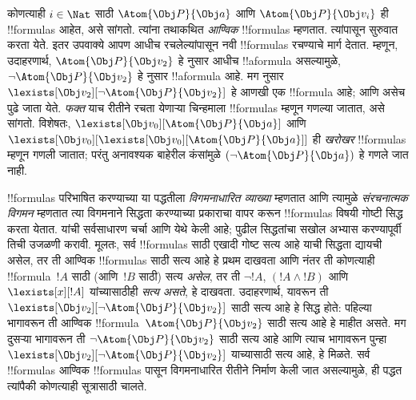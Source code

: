 \documentclass[../../../include/open-logic-section]{subfiles}
\begin{document}
कोणत्याही $i \in \Nat$ साठी $\Atom{\Obj P}{\Obj a}$ आणि
$\Atom{\Obj P}{\Obj v_i}$ ही !!{formula}s आहेत, असे
 सांगतो. त्यांना तथाकथित \emph{आण्विक} !!{formula}s
म्हणतात. त्यांपासून सुरुवात करता येते. इतर उपवाक्ये आपण आधीच
रचलेल्यांपासून नवी !!{formula}s रचण्याचे मार्ग देतात. म्हणून,
उदाहरणार्थ, $\Atom{\Obj P}{\Obj v_2}$ हे  नुसार आधीच
!!a{formula} असल्यामुळे, $\lnot \Atom{\Obj P}{\Obj v_2}$ हे
 नुसार !!a{formula} आहे. मग
 नुसार $\lexists[\Obj v_2][\lnot \Atom{\Obj P}{\Obj
v_2}]$ हे आणखी एक !!{formula} आहे; आणि असेच पुढे जाता येते. \emph{फक्त} याच
रीतीने रचता येणाऱ्या चिन्हमाला !!{formula}s म्हणून गणल्या जातात, असे
 सांगतो. विशेषतः,
$\lexists[\Obj v_0][\Atom{\Obj P}{\Obj a}]$ आणि $\lexists[\Obj
  v_0][\lexists[\Obj v_0][\Atom{\Obj P}{\Obj a}]]$ ही
\emph{खरोखर} !!{formula}s म्हणून गणली जातात; परंतु अनावश्यक बाहेरील
कंसांमुळे $(\lnot \Atom{\Obj P}{\Obj a})$ हे गणले जात नाही.

!!{formula}s परिभाषित करण्याच्या या पद्धतीला \emph{विगमनाधारित
व्याख्या} म्हणतात आणि त्यामुळे \emph{संरचनात्मक विगमन} म्हणतात त्या
विगमनाने सिद्धता करण्याच्या प्रकाराचा वापर करून !!{formula}s विषयी
गोष्टी सिद्ध करता येतात. यांची सर्वसाधारण चर्चा
 आणि  येथे केली
आहे; पुढील सिद्धतांचा सखोल अभ्यास करण्यापूर्वी तिची उजळणी करावी. मूलतः,
सर्व !!{formula}s साठी एखादी गोष्ट सत्य आहे याची सिद्धता द्यायची असेल,
तर ती आण्विक !!{formula}s साठी सत्य आहे हे प्रथम दाखवता आणि नंतर ती
कोणत्याही !!{formula}~$!A$ साठी (आणि~$!B$ साठी) सत्य \emph{असेल}, तर
ती $\lnot !A$, $(!A \land !B)$ आणि $\lexists[x][!A]$ यांच्यासाठीही
\emph{सत्य असते}, हे दाखवता. उदाहरणार्थ, यावरून ती
$\lexists[\Obj v_2][\lnot \Atom{\Obj P}{\Obj v_2}]$ साठी सत्य आहे हे
सिद्ध होते: पहिल्या भागावरून ती आण्विक !!{formula}~$\Atom{\Obj
P}{\Obj v_2}$ साठी सत्य आहे हे माहीत असते. मग दुसऱ्या भागावरून ती
$\lnot \Atom{\Obj P}{\Obj v_2}$ साठी सत्य आहे आणि त्याच भागावरून पुन्हा
$\lexists[\Obj v_2][\lnot \Atom{\Obj P}{\Obj v_2}]$ याच्यासाठी सत्य
आहे, हे मिळते. सर्व !!{formula}s आण्विक !!{formula}s पासून
विगमनाधारित रीतीने निर्माण केली जात असल्यामुळे, ही पद्धत त्यांपैकी
कोणत्याही सूत्रासाठी चालते.
\end{document}
